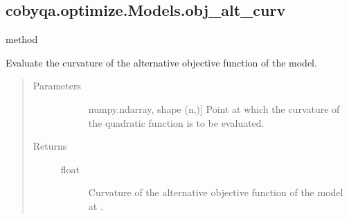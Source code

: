\documentclass[letterpaper,10pt,english]{sphinxmanual}
\begin{document}
\begin{fulllineitems}
\begin{fulllineitems}
\begin{quote}
\begin{description}
\begin{description}
\end{description}

\end{description}\end{quote}

\end{fulllineitems}



\subsection{cobyqa.optimize.Models.obj\_alt\_curv}
\label{\detokenize{refs/generated/cobyqa.optimize.Models.obj_alt_curv:cobyqa-optimize-models-obj-alt-curv}}\label{\detokenize{refs/generated/cobyqa.optimize.Models.obj_alt_curv::doc}}
\sphinxAtStartPar
method

\begin{fulllineitems}
\label{\detokenize{refs/generated/cobyqa.optimize.Models.obj_alt_curv:cobyqa.optimize.Models.obj_alt_curv}}
\sphinxAtStartPar
Evaluate the curvature of the alternative objective function of the
model.
\begin{quote}\begin{description}
\item[{Parameters}] \leavevmode\begin{description}
\item[{}] \leavevmode{[}numpy.ndarray, shape (n,){]}
\sphinxAtStartPar
Point at which the curvature of the quadratic function is to be
evaluated.

\end{description}

\item[{Returns}] \leavevmode\begin{description}
\item[{float}] \leavevmode
\sphinxAtStartPar
Curvature of the alternative objective function of the model at .

\end{description}

\end{description}\end{quote}

\end{fulllineitems}




\end{fulllineitems}
\end{document}
